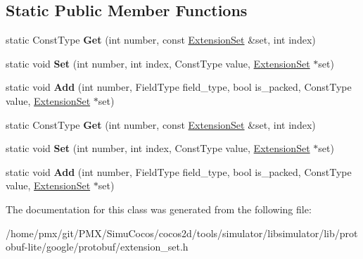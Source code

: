 \subsection*{Static Public Member Functions}
\begin{DoxyCompactItemize}
\item 
\mbox{\label{classgoogle_1_1protobuf_1_1internal_1_1RepeatedEnumTypeTraits_a643675b9093c2e8262bb0d9e2f95a3da}} 
static Const\+Type {\bfseries Get} (int number, const \hyperlink{classgoogle_1_1protobuf_1_1internal_1_1ExtensionSet}{Extension\+Set} \&set, int index)
\item 
\mbox{\label{classgoogle_1_1protobuf_1_1internal_1_1RepeatedEnumTypeTraits_ad871971f8263d6c3199c3d1ca16548b7}} 
static void {\bfseries Set} (int number, int index, Const\+Type value, \hyperlink{classgoogle_1_1protobuf_1_1internal_1_1ExtensionSet}{Extension\+Set} $\ast$set)
\item 
\mbox{\label{classgoogle_1_1protobuf_1_1internal_1_1RepeatedEnumTypeTraits_a0de2f213a4f529be09203838ba783957}} 
static void {\bfseries Add} (int number, Field\+Type field\+\_\+type, bool is\+\_\+packed, Const\+Type value, \hyperlink{classgoogle_1_1protobuf_1_1internal_1_1ExtensionSet}{Extension\+Set} $\ast$set)
\item 
\mbox{\label{classgoogle_1_1protobuf_1_1internal_1_1RepeatedEnumTypeTraits_a643675b9093c2e8262bb0d9e2f95a3da}} 
static Const\+Type {\bfseries Get} (int number, const \hyperlink{classgoogle_1_1protobuf_1_1internal_1_1ExtensionSet}{Extension\+Set} \&set, int index)
\item 
\mbox{\label{classgoogle_1_1protobuf_1_1internal_1_1RepeatedEnumTypeTraits_ad871971f8263d6c3199c3d1ca16548b7}} 
static void {\bfseries Set} (int number, int index, Const\+Type value, \hyperlink{classgoogle_1_1protobuf_1_1internal_1_1ExtensionSet}{Extension\+Set} $\ast$set)
\item 
\mbox{\label{classgoogle_1_1protobuf_1_1internal_1_1RepeatedEnumTypeTraits_a0de2f213a4f529be09203838ba783957}} 
static void {\bfseries Add} (int number, Field\+Type field\+\_\+type, bool is\+\_\+packed, Const\+Type value, \hyperlink{classgoogle_1_1protobuf_1_1internal_1_1ExtensionSet}{Extension\+Set} $\ast$set)
\end{DoxyCompactItemize}


The documentation for this class was generated from the following file\+:\begin{DoxyCompactItemize}
\item 
/home/pmx/git/\+P\+M\+X/\+Simu\+Cocos/cocos2d/tools/simulator/libsimulator/lib/protobuf-\/lite/google/protobuf/extension\+\_\+set.\+h\end{DoxyCompactItemize}

